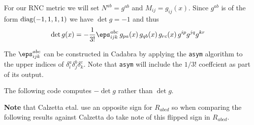 \documentclass[12pt]{cdblatex}
\begin{document}
For our RNC metric we will set $N^{ab} = g^{ab}$ and $M_{ij} = g_{ij}(x)$. Since $g^{ab}$ is
of the form ${\rm diag}(-1,1,1,1)$ we have $\det g = -1$ and thus
\begin{align}
   \det g(x) = - \frac{1}{3!} \eps^{abc}_{ijk}\, g_{pa}(x)\, g_{qb}(x)\, g_{rc}(x)\, g^{ip} g^{jq} g^{kr}
\end{align}

The $\eps^{abc}_{ijk}$ can be constructed in Cadabra by applying the \verb|asym| algorithm
to the upper indices of $\delta^a_i \delta^b_j \delta^c_k$. Note that \verb|asym| will
include the $1/3!$ coeffcient as part of its output.

The following code computes $-\det g$ rather than $\det g$.

{\bf Note} that Calzetta etal. use an opposite sign for $R_{abcd}$ so when comparing the
following results against Calzetta do take note of this flipped sign in $R_{abcd}$.

\clearpage
\end{document}
